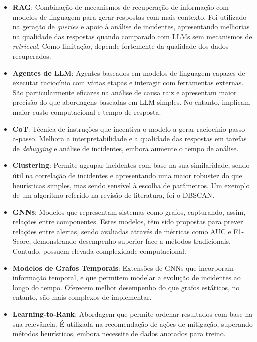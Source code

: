 	\begin{itemize}
		\item \textbf{\gls{RAG}}: 
		Combinação de mecanismos de recuperação de informação com modelos de linguagem para gerar respostas com mais contexto. 
		Foi utilizado na geração de \textit{queries} e apoio à análise de incidentes, apresentando melhorias na qualidade das respostas quando comparado com \gls{LLM}s sem mecanismos de \textit{retrieval}. 
		Como limitação, depende fortemente da qualidade dos dados recuperados. \autocite{Reference4, Reference5}
		
		\item \textbf{Agentes de \gls{LLM}}: 
		Agentes baseados em modelos de linguagem capazes de executar raciocínio com várias etapas e interagir com ferramentas externas. 
		São particularmente eficazes na análise de causa raiz e apresentam maior precisão do que abordagens baseadas em \gls{LLM} simples. No entanto, implicam maior custo computacional e tempo de resposta. \autocite{Reference1}
		
		\item \textbf{\gls{CoT}}: 
		Técnica de instruções que incentiva o modelo a gerar raciocínio passo-a-passo. 
		Melhora a interpretabilidade e a qualidade das respostas em tarefas de \textit{debugging} e análise de incidentes, embora aumente o tempo de análise. \autocite{Reference1, Reference5}
		
		\item \textbf{Clustering}: 
		Permite agrupar incidentes com base na sua similaridade, sendo útil na correlação de incidentes e apresentando uma maior robustez do que heurísticas simples, mas sendo sensível à escolha de parâmetros. Um exemplo de um algoritmo referido na revisão de literatura, foi o \gls{DBSCAN}. \autocite{Reference3}
		
		\item \textbf{\gls{GNNs}}: 
		Modelos que representam sistemas como grafos, capturando, assim, relações entre componentes. 
		Estes modelos, têm sido propostas para prever relações entre alertas, sendo avaliadas através de métricas como \gls{AUC} e F1-Score, demonstrando desempenho superior face a métodos tradicionais.
		Contudo, possuem elevada complexidade computacional. \autocite{Reference6}
		
		\item \textbf{Modelos de Grafos Temporais}: 
		Extensões de \gls{GNNs} que incorporam informação temporal, e que permitem modelar a evolução de incidentes ao longo do tempo. 
		Oferecem melhor desempenho do que grafos estáticos, no entanto, são mais complexos de implementar. \autocite{Reference6}
		
		\item \textbf{Learning-to-Rank}: 
		Abordagem que permite ordenar resultados com base na sua relevância. 
		É utilizada na recomendação de ações de mitigação, superando métodos heurísticos, embora necessite de dados anotados para treino. \autocite{Reference2}
	\end{itemize}
			
